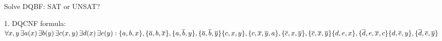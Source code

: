 \documentclass[xcolor=table	]{beamer}
\newcommand{\ol}{\overline}
\begin{document}
\begin{frame}{Solve DQBF: SAT or UNSAT?}
\begin{alertblock}{1. DQCNF formula:}
	{		
		$ \forall x, y \, \exists a(x) \, \exists  b(y) \, \exists c(x,y) \, \exists d(x) \, \exists e(y) :
		   \{a,b,x\}, \{\ol{a},b,\ol{x}\}, \{a,\ol{b},y\}, \{\ol{a},\ol{b},\ol{y}\}  \\
		   \{c,x,y\}, \{c,\ol{x},\ol{y}, a\}, \{\ol{c},x,\ol{y}\}, \{\ol{c},\ol{x},\ol{y}\} \\
		   \{d,e,x\}, \{\ol{d},e,\ol{x}, c\} \{d,\ol{e},y\}, \{\ol{d},\ol{e},\ol{y}\} $
	}
\end{alertblock}
%
\end{frame}

%
%
%
%

%
% 
% 
%
% 
\end{document}
